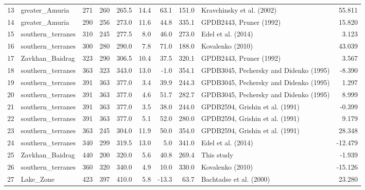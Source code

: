 \documentclass[11pt]{article}
\begin{document}
{\begin{tabular}{llrrrrrrlr}
13 &     greater\_Amuria &       271 &      260 &       265.5 &  14.4 &  63.1 &  151.0 &               Kravchinsky et al. (2002) &    55.811 \\
14 &     greater\_Amuria &       290 &      256 &       273.0 &  11.6 &  44.8 &  335.1 &                 GPDB2443, Pruner (1992) &    15.820 \\
15 &  southern\_terranes &       310 &      245 &       277.5 &   8.0 &  46.0 &  273.0 &                      Edel et al. (2014) &     3.123 \\
16 &  southern\_terranes &       300 &      280 &       290.0 &   7.8 &  71.0 &  188.0 &                        Kovalenko (2010) &    43.039 \\
17 &    Zavkhan\_Baidrag &       323 &      290 &       306.5 &  10.4 &  37.5 &  320.1 &                 GPDB2443, Pruner (1992) &     3.567 \\
18 &  southern\_terranes &       363 &      323 &       343.0 &  13.0 &  -1.0 &  354.1 &  GPDB3045, Pechersky and Didenko (1995) &    -8.390 \\
19 &  southern\_terranes &       391 &      363 &       377.0 &   3.4 &  39.9 &  244.3 &  GPDB3045, Pechersky and Didenko (1995) &     1.297 \\
20 &  southern\_terranes &       391 &      363 &       377.0 &   4.6 &  51.7 &  282.7 &  GPDB3045, Pechersky and Didenko (1995) &     8.999 \\
21 &  southern\_terranes &       391 &      363 &       377.0 &   3.5 &  38.0 &  244.0 &         GPDB2594, Grishin et al. (1991) &    -0.399 \\
22 &  southern\_terranes &       391 &      363 &       377.0 &   5.1 &  52.0 &  280.0 &         GPDB2594, Grishin et al. (1991) &     9.179 \\
23 &  southern\_terranes &       363 &      245 &       304.0 &  11.9 &  50.0 &  354.0 &         GPDB2594, Grishin et al. (1991) &    28.348 \\
24 &  southern\_terranes &       340 &      299 &       319.5 &  13.0 &   5.0 &  341.0 &                      Edel et al. (2014) &   -12.479 \\
25 &    Zavkhan\_Baidrag &       440 &      200 &       320.0 &   5.6 &  40.8 &  269.4 &                              This study &    -1.939 \\
26 &  southern\_terranes &       360 &      320 &       340.0 &   4.9 &  10.0 &  330.0 &                        Kovalenko (2010) &   -15.126 \\
27 &          Lake\_Zone &       423 &      397 &       410.0 &   5.8 & -13.3 &   63.7 &                 Bachtadse et al. (2000) &    23.280 \\

\end{tabular}}
\end{document}
